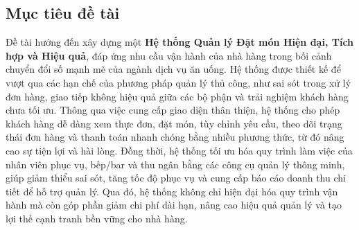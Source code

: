\subsection{Mục tiêu đề tài}

Đề tài hướng đến xây dựng một \textbf{Hệ thống Quản lý Đặt món Hiện đại, Tích hợp và Hiệu quả}, đáp ứng nhu cầu vận hành của nhà hàng trong bối cảnh chuyển đổi số mạnh mẽ của ngành dịch vụ ăn uống. Hệ thống được thiết kế để vượt qua các hạn chế của phương pháp quản lý thủ công, như sai sót trong xử lý đơn hàng, giao tiếp không hiệu quả giữa các bộ phận và trải nghiệm khách hàng chưa tối ưu. Thông qua việc cung cấp giao diện thân thiện, hệ thống cho phép khách hàng dễ dàng xem thực đơn, đặt món, tùy chỉnh yêu cầu, theo dõi trạng thái đơn hàng và thanh toán nhanh chóng bằng nhiều phương thức, từ đó nâng cao sự tiện lợi và hài lòng. Đồng thời, hệ thống tối ưu hóa quy trình làm việc của nhân viên phục vụ, bếp/bar và thu ngân bằng các công cụ quản lý thông minh, giúp giảm thiểu sai sót, tăng tốc độ phục vụ và cung cấp báo cáo doanh thu chi tiết để hỗ trợ quản lý. Qua đó, hệ thống không chỉ hiện đại hóa quy trình vận hành mà còn góp phần giảm chi phí dài hạn, nâng cao hiệu quả quản lý và tạo lợi thế cạnh tranh bền vững cho nhà hàng.



